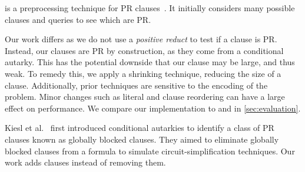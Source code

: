 \prelearn is a preprocessing technique for PR clauses~\cite{prelearn}. It
initially considers many possible clauses and queries \sadical to see which are
PR.

Our work differs as we do not use a \emph{positive reduct} to test if a clause
is PR. Instead, our clauses are PR by construction, as they come from a
conditional autarky. This has the potential downside that our clause may be
large, and thus weak. To remedy this, we apply a shrinking technique, reducing
the size of a clause. Additionally, prior techniques are sensitive to the
encoding of the problem. Minor changes such as literal and clause reordering can
have a large effect on performance. We compare our implementation \tool to
\sadical and \prelearn in \autoref{sec:evaluation}.

Kiesl et al.~\cite{conditionalautarkies} first introduced conditional autarkies
to identify a class of PR clauses known as globally blocked clauses. They aimed
to eliminate globally blocked clauses from a formula to simulate
circuit-simplification techniques. Our work adds clauses instead of removing
them.

